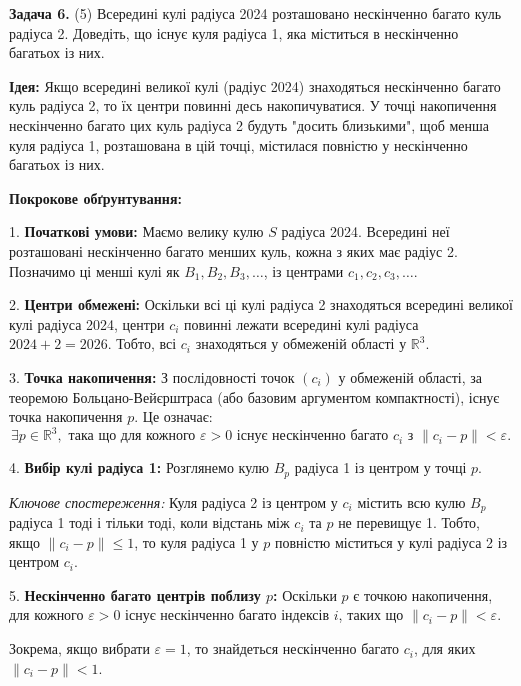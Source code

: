 \documentclass{article}
\begin{document}
\noindent\textbf{Задача 6.} (5) Всередині кулі радіуса 2024 розташовано нескінченно багато куль радіуса 2. Доведіть, що існує куля радіуса 1, яка міститься в нескінченно багатьох із них.

\bigskip

\textbf{Ідея:}  
Якщо всередині великої кулі (радіус 2024) знаходяться нескінченно багато куль радіуса 2, то їх центри повинні десь накопичуватися. У точці накопичення нескінченно багато цих куль радіуса 2 будуть "досить близькими", щоб менша куля радіуса 1, розташована в цій точці, містилася повністю у нескінченно багатьох із них.

\bigskip

\textbf{Покрокове обґрунтування:}

1. \textbf{Початкові умови:}  
   Маємо велику кулю \(S\) радіуса 2024. Всередині неї розташовані нескінченно багато менших куль, кожна з яких має радіус 2. Позначимо ці менші кулі як \(B_1, B_2, B_3, \dots\), із центрами \(c_1, c_2, c_3, \dots\).

2. \textbf{Центри обмежені:}  
   Оскільки всі ці кулі радіуса 2 знаходяться всередині великої кулі радіуса 2024, центри \(c_i\) повинні лежати всередині кулі радіуса \(2024 + 2 = 2026\). Тобто, всі \( c_i \) знаходяться у обмеженій області у \(\mathbb{R}^3\).

3. \textbf{Точка накопичення:}  
   З послідовності точок \((c_i)\) у обмеженій області, за теоремою Больцано-Вейєрштраса (або базовим аргументом компактності), існує точка накопичення \(p\). Це означає:
   \[
   \exists p \in \mathbb{R}^3, \text{ така що для кожного } \varepsilon > 0 \text{ існує нескінченно багато } c_i \text{ з } \|c_i - p\| < \varepsilon.
   \]

4. \textbf{Вибір кулі радіуса 1:}  
   Розглянемо кулю \(B_p\) радіуса 1 із центром у точці \(p\).

   \textit{Ключове спостереження:}  
   Куля радіуса 2 із центром у \(c_i\) містить всю кулю \(B_p\) радіуса 1 тоді і тільки тоді, коли відстань між \(c_i\) та \(p\) не перевищує 1. Тобто, якщо \(\|c_i - p\| \leq 1\), то куля радіуса 1 у \(p\) повністю міститься у кулі радіуса 2 із центром \(c_i\).

5. \textbf{Нескінченно багато центрів поблизу \(p\):}  
   Оскільки \(p\) є точкою накопичення, для кожного \(\varepsilon > 0\) існує нескінченно багато індексів \(i\), таких що \(\|c_i - p\| < \varepsilon\).

   Зокрема, якщо вибрати \(\varepsilon = 1\), то знайдеться нескінченно багато \( c_i \), для яких \(\|c_i - p\| < 1\).
\end{document}
